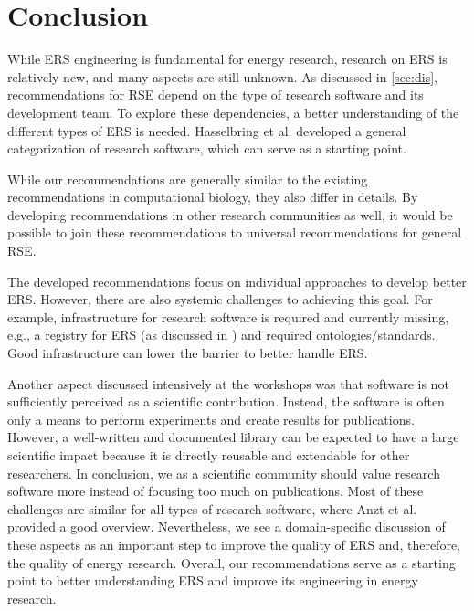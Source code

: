 \section{Conclusion}
\label{sec:outlook}

While \ac{ERS} engineering is fundamental for energy research, research on \ac{ERS} is relatively new, and many aspects are still unknown.
As discussed in \autoref{sec:dis}, recommendations for \ac{RSE} depend on the type of research software and its development team. To explore these dependencies, a better understanding of the different types of \ac{ERS} is needed. Hasselbring et al. \cite{hasselbring_toward_2024} developed a general categorization of research software, which can serve as a starting point.

While our recommendations are generally similar to the existing recommendations in computational biology, they also differ in details. By developing recommendations in other research communities as well, it would be possible to join these recommendations to universal recommendations for general \ac{RSE}.

The developed recommendations focus on individual approaches to develop better \ac{ERS}. However, there are also systemic challenges to achieving this goal. 
For example, infrastructure for research software is required and currently missing, e.g., a registry for \ac{ERS} (as discussed in \cite{ferenz_towards_2023}) and required ontologies/standards. Good infrastructure can lower the barrier to better handle \ac{ERS}.

Another aspect discussed intensively at the workshops was that software is not sufficiently perceived as a scientific contribution. Instead, the software is often only a means to perform experiments and create results for publications. 
However, a well-written and documented library can be expected to have a large scientific impact because it is directly reusable and extendable for other researchers. In conclusion, we as a scientific community should value research software more instead of focusing too much on publications. 
Most of these challenges are similar for all types of research software, where Anzt et al. \cite{anzt2020environment} provided a good overview. Nevertheless, we see a domain-specific discussion of these aspects as an important step to improve the quality of \ac{ERS} and, therefore, the quality of energy research.
Overall, our recommendations serve as a starting point to better understanding \ac{ERS} and improve its engineering in energy research.